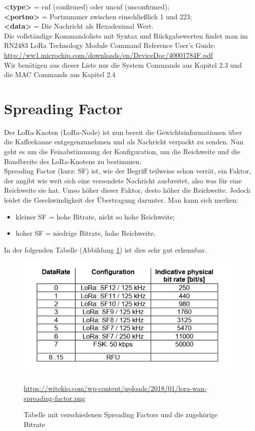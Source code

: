 \textbf{<type>} = cnf (confirmed) oder uncnf (unconfirmed);\\

\textbf{<portno>} = Portnummer zwischen einschließlich 1 und 223;\\

\textbf{<data>} = Die Nachricht als Hexadezimal Wert.\\
\noindent
Die vollständige Kommandoliste mit Syntax und Rückgabewerten findet man im RN2483 LoRa Technology Module Command Reference User’s Guide: \url{http://ww1.microchip.com/downloads/en/DeviceDoc/40001784F.pdf}\\
Wir benötigen aus dieser Liste nur die System Commands aus Kapitel 2.3 und die MAC Commands aus Kapitel 2.4

\section{Spreading Factor} \label{sec:spreadingfactor}
Der LoRa-Knoten (LoRa-Node) ist nun bereit die Gewichtsinformationen über die Kaffeekanne entgegenzunehmen und als Nachricht verpackt zu senden.
Nun geht es um die Feinabstimmung der Konfiguration, um die Reichweite und die Bandbreite des LoRa-Knotens zu bestimmen.\\
Spreading Factor (kurz: SF) ist, wie der Begriff teilweise schon verrät, ein Faktor, der angibt wie weit sich eine versendete Nachricht ausbreitet, also was für eine Reichweite sie hat. Umso höher dieser Faktor, desto höher die Reichweite. Jedoch leidet die Geschwindigkeit der Übertragung darunter. Man kann sich merken: 
\begin{itemize}
    \item kleiner SF = hohe Bitrate, nicht so hohe Reichweite;
    \item hoher SF = niedrige Bitrate, hohe Reichweite.
\end{itemize} 
In der folgenden Tabelle (Abbildung \ref{fig:spreading-factor}) ist dies sehr gut erkennbar. 
\begin{figure}[H]
    \center
    \includegraphics[width=15cm]{Bilder/lora-10.png}\\
    \caption{Tabelle mit verschiedenen Spreading Factors und die zugehörige Bitrate}
    \begin{center} \quelle\url{https://witekio.com/wp-content/uploads/2018/01/lora-wan-spreading-factor.png} \end{center}
        \label{fig:spreading-factor}
\end{figure}
